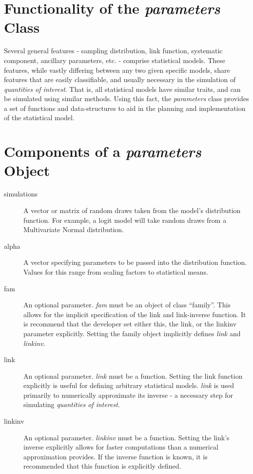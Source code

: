 
\section{Functionality of the \emph{parameters} Class}

Several general features - sampling distribution, link function,
systematic component, ancillary parameters, etc. - comprise
statistical models.  These features, while vastly differing between
any two given specific models, share features that are easily
classifiable, and usually necessary in the simulation of
\emph{quantities of interest}.  That is, all statistical models have
similar traits, and can be simulated using similar methods.  Using
this fact, the \emph{parameters} class provides a set of functions
and data-structures to aid in the planning and implementation of 
the statistical model.


\section{Components of a \emph{parameters} Object}

\begin{description}
	\item[simulations] A vector or matrix of random draws taken from
		the model's distribution function.  For example, a logit model
		will take random draws from a Multivariate Normal distribution.
		
	\item[alpha] A vector specifying parameters to be passed into
		the distribution function.  Values for this range from scaling
		factors to statistical means.
	
	\item[fam] An optional parameter.  \emph{fam} must be an object
		of class ``family''.  This allows for the implicit specification
		of the link and link-inverse function.  It is recommend that the
		developer set either this, the link, or the linkinv parameter
		explicitly.  Setting the family object implicitly defines
		\emph{link} and \emph{linkinv}.
		
	\item[link] An optional parameter.  \emph{link} must be a function.
		Setting the link function explicitly is useful for defining
		arbitrary statistical models.  \emph{link} is used primarily to
		numerically approximate its inverse - a necessary step for
		simulating \emph{quantities of interest}.
		
	\item[linkinv] An optional parameter.  \emph{linkinv} must be a
		function.  Setting the link's inverse explicitly allows for faster
		computations than a numerical approximation provides.  If the
		inverse function is known, it is recommended that this function
		is explicitly defined.
		
\end{description}

